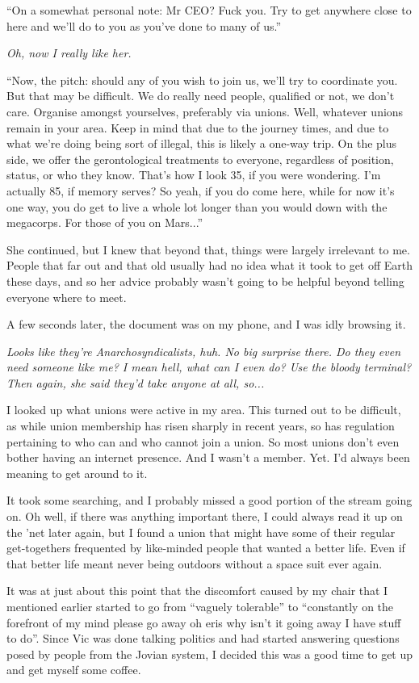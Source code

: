 ``On a somewhat personal note: Mr CEO? Fuck you. Try to get anywhere close to
here and we'll do to you as you've done to many of us.''

\textit{Oh, now I \textnormal{really} like her.}

``Now, the pitch: should any of you wish to join us, we'll try to coordinate
you. But that may be difficult. We do really need people, qualified or not, we
don't care. Organise amongst yourselves, preferably via unions. Well, whatever
unions remain in your area. Keep in mind that due to the journey times, and due
to what we're doing being sort of illegal, this is likely a one-way trip. On the
plus side, we offer the gerontological treatments to everyone, regardless of
position, status, or who they know. That's how I look 35, if you were wondering.
I'm actually 85, if memory serves? So yeah, if you do come here, while for now
it's one way, you do get to live a whole lot longer than you would down with the
megacorps. For those of you on Mars...''

She continued, but I knew that beyond that, things were largely irrelevant to
me. People that far out and that old usually had no idea what it took to get off
Earth these days, and so her advice probably wasn't going to be helpful beyond
telling everyone where to meet.

A few seconds later, the document was on my phone, and I was idly browsing it.

\textit{Looks like they're Anarchosyndicalists, huh. No big surprise there. Do
  they even need someone like me? I mean hell, what can I even do? Use the
  bloody terminal? Then again, she said they'd take anyone at all, so...}

I looked up what unions were active in my area. This turned out to be difficult,
as while union membership has risen sharply in recent years, so has regulation
pertaining to who can and who cannot join a union. So most unions don't even
bother having an internet presence. And I wasn't a member. Yet. I'd always been
meaning to get around to it.

It took some searching, and I probably missed a good portion of the stream going
on. Oh well, if there was anything important there, I could always read it up on
the 'net later again, but I found a union that might have some of their regular
get-togethers frequented by like-minded people that wanted a better life. Even
if that better life meant never being outdoors without a space suit ever again.

It was at just about this point that the discomfort caused by my chair that I
mentioned earlier started to go from ``vaguely tolerable'' to ``constantly on
the forefront of my mind please go away oh eris why isn't it going away I have
stuff to do''. Since Vic was done talking politics and had started answering
questions posed by people from the Jovian system, I decided this was a good time
to get up and get myself some coffee.

